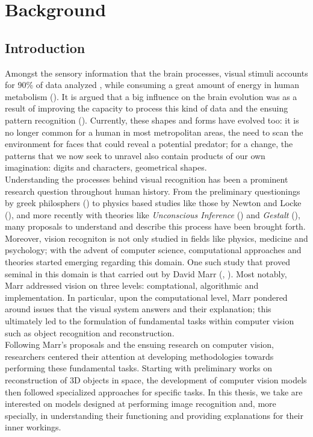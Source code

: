 \chapter{Background}
\label{ch:rel}
\chaptertoc{}
\section{Introduction}
\noindent Amongst the sensory information that the brain processes, visual stimuli accounts 
for 90\% of data analyzed \autocite{potter2014detecting}, while consuming a great amount of energy 
in human metabolism (\cite{phelps1981metabolic}). It is argued that a big influence on the 
brain evolution was as a result of improving the capacity to process this kind of data and the 
ensuing  pattern recognition (\cite{mattson2014superior}). 
Currently, these shapes and forms have evolved too: it is no longer common for a human in most 
metropolitan areas, the need to scan the environment for faces that could reveal a potential 
predator; for a change, the patterns that we now seek to unravel also contain products of our own 
imagination: digits and characters, geometrical shapes.\\

\noindent Understanding the processes behind visual recognition has been a prominent research 
question throughout human history. From the preliminary questionings by greek  philosphers 
(\cite{finger2001origins}) to physics based studies like those by Newton and Locke 
(\cite{swenson2010optics}), and more recently with theories like \textit{Unconscious Inference} 
(\cite{gullstrand1909hemholtz}) and \textit{Gestalt} (\cite{wagemans2012century}), many proposals 
to understand and describe this process have been brought forth. Moreover, vision recogniton is not 
only studied in fields like physics, medicine and psychology; 
with the advent of computer science, computational approaches and theories started emerging 
regarding this domain. One such study that proved seminal in this domain is that carried out by 
David Marr (\cite{poggio1981marr}, \cite{marr2010vision}). Most notably, Marr addressed vision on 
three levels: comptational, algorithmic and implementation. In particular, upon the computational 
level, Marr pondered around issues that the visual system answers and their explanation; this 
ultimately led to the formulation of fundamental tasks within computer vision such as object 
recognition and reconstruction.\\

\noindent Following Marr's proposals and the ensuing research on computer vision, researchers 
centered their attention at developing methodologies towards performing these fundamental tasks.
Starting with preliminary works on reconstruction of 3D objects in space, the development of 
computer vision models then followed specialized approaches for specific tasks. In this thesis, 
we take are interested on models designed at performing image recognition and, more specially, in 
understanding their functioning and providing explanations for their inner workings.\\

